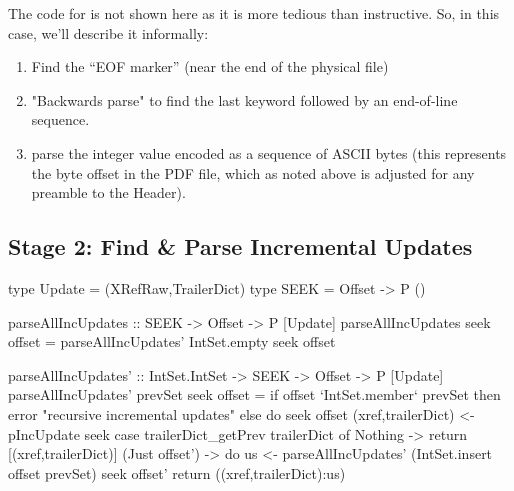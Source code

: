 The code for  is
not shown here as it is more tedious than instructive.
So, in this case, we'll describe it informally:
\begin{enumerate}
\item Find the ``EOF marker''  (near the end of the physical
  file)
\item "Backwards parse" to find the last 
  keyword followed by an end-of-line sequence.
\item parse the integer value encoded as a sequence of ASCII bytes
  (this represents the byte offset in the PDF file, which as noted
  above is adjusted for any preamble to the Header).
\end{enumerate}

\subsection{Stage 2: Find \& Parse Incremental Updates}

\lstset{numbers=right}
\begin{code}
type Update = (XRefRaw,TrailerDict)
type SEEK   = Offset -> P ()

parseAllIncUpdates :: SEEK -> Offset -> P [Update]
parseAllIncUpdates seek offset =
  parseAllIncUpdates' IntSet.empty seek offset

parseAllIncUpdates' :: IntSet.IntSet -> SEEK -> Offset -> P [Update]
parseAllIncUpdates' prevSet seek offset =
    if offset `IntSet.member` prevSet then
      error "recursive incremental updates"
    else
      do
      seek offset
      (xref,trailerDict) <- pIncUpdate seek
      case trailerDict_getPrev trailerDict of 
        Nothing        -> return [(xref,trailerDict)]
        (Just offset') -> do
                          us <- parseAllIncUpdates'
                                  (IntSet.insert offset prevSet)
                                  seek
                                  offset'
                          return ((xref,trailerDict):us)
\end{code}
\lstset{numbers=none}


